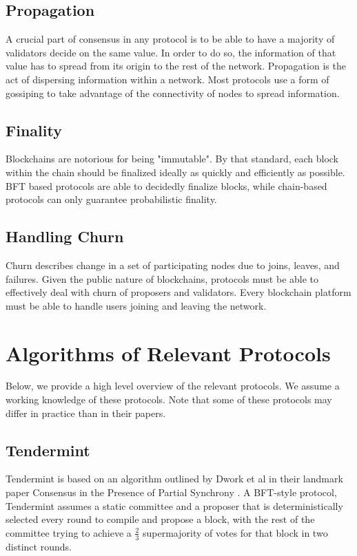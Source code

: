 \documentclass[10pt,journal,compsoc]{IEEEtran}
\newcommand\alberto[1]{\todo[color=yellow,inline]{\textbf{Alberto:} #1}}
\begin{document}
\subsection{Propagation}
A crucial part of consensus in any protocol is to be able to have a majority of validators decide on the same value. In order to do so, the information of that value has to spread from its origin to the rest of the network. Propagation is the act of dispersing information within a network. Most protocols use a form of gossiping to take advantage of the connectivity of nodes to spread information.

\subsection{Finality}
Blockchains are notorious for being "immutable". By that standard, each block within the chain should be finalized ideally as quickly and efficiently as possible. BFT based protocols are able to decidedly finalize blocks, while chain-based protocols can only guarantee probabilistic finality.
\alberto{Improve this.}

\subsection{Handling Churn}
Churn describes change in a set of participating nodes due to joins, leaves, and failures. \cite{GodfreyEtAl} Given the public nature of blockchains, protocols must be able to effectively deal with churn of proposers and validators. Every blockchain platform must be able to handle users joining and leaving the network.

\section{Algorithms of Relevant Protocols}
Below, we provide a high level overview of the relevant protocols. We assume a working knowledge of these protocols. Note that some of these protocols may differ in practice than in their papers.

\subsection{Tendermint}
Tendermint \cite{Buchman} is based on an algorithm outlined by Dwork et al in their landmark paper Consensus in the Presence of Partial Synchrony \cite{DworkEtAl}. A BFT-style protocol, Tendermint assumes a static committee and a proposer that is deterministically selected every round to compile and propose a block, with the rest of the committee trying to achieve a \(\frac{2}{3}\) supermajority of votes for that block in two distinct rounds.
\end{document}
